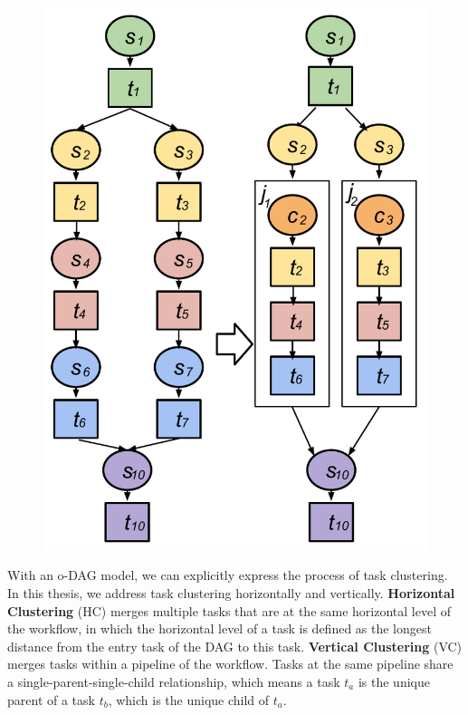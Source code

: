 \begin{figure}[!htb]
\centering
 \includegraphics[width=0.5\linewidth]{figures/model/vc.pdf}
  \label{fig:model_vc}
\end{figure}





With an o-DAG model, we can explicitly express the process of task clustering. In this thesis, we address task clustering horizontally and vertically. \textbf{Horizontal Clustering} (HC) merges multiple tasks that are at the same horizontal level of the workflow, in which the horizontal level of a task is defined as the longest distance from the entry task of the DAG to this task. \textbf{Vertical Clustering} (VC) merges tasks within a pipeline of the workflow. Tasks at the same pipeline share a single-parent-single-child relationship, which means a task $t_a$ is the unique parent of a task $t_b$, which is the unique child of $t_a$. 


